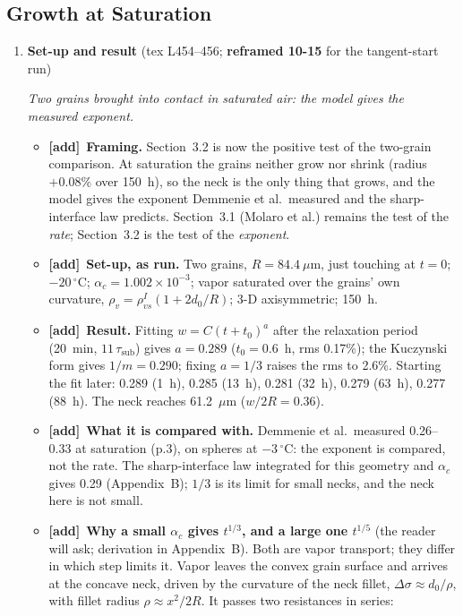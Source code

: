 \documentclass[11pt]{article}
\newcommand{\Pg}[3]{\item \textbf{#1} {\small(#2)}\par\textit{#3}}
\newcommand{\tA}{\textcolor{have}{\textbf{[add]}}\ }
\begin{document}
\subsection{Growth at Saturation}
\begin{enumerate}
\Pg{Set-up and result}{tex L454--456; \textbf{reframed 10-15} for the tangent-start run}{Two grains brought into contact in saturated air: the model gives the measured exponent.}
  \begin{itemize}
  \item \tA \textbf{Framing.} Section~3.2 is now the positive test of the
    two-grain comparison. At saturation the grains neither grow nor shrink
    (radius $+0.08\%$ over 150~h), so the neck is the only thing that grows,
    and the model gives the exponent Demmenie et al.\ measured and the
    sharp-interface law predicts. Section~3.1 (Molaro et al.) remains the
    test of the \emph{rate}; Section~3.2 is the test of the \emph{exponent}.
  \item \tA \textbf{Set-up, as run.} Two grains, $R = 84.4~\mu$m, just
    touching at $t = 0$; $-20\,^{\circ}$C; $\alpha_c = 1.002\times10^{-3}$;
    vapor saturated over the grains' own curvature, $\rho_v =
    \rho_{vs}^{I}(1 + 2d_0/R)$; 3-D axisymmetric; 150~h.
  \item \tA \textbf{Result.} Fitting $w = C(t+t_0)^{a}$ after the relaxation
    period (20~min, $11\,\tau_{\mathrm{sub}}$) gives $a = 0.289$ ($t_0 =
    0.6$~h, rms 0.17\%); the Kuczynski form gives $1/m = 0.290$; fixing
    $a = 1/3$ raises the rms to 2.6\%. Starting the fit later: 0.289 (1~h),
    0.285 (13~h), 0.281 (32~h), 0.279 (63~h), 0.277 (88~h). The neck reaches
    61.2~$\mu$m ($w/2R = 0.36$).
  \item \tA \textbf{What it is compared with.} Demmenie et al.\ measured
    0.26--0.33 at saturation (p.3), on spheres at $-3\,^{\circ}$C: the
    exponent is compared, not the rate. The sharp-interface law integrated
    for this geometry and $\alpha_c$ gives 0.29 (Appendix~B); $1/3$ is its
    limit for small necks, and the neck here is not small.
  \item \tA \textbf{Why a small $\alpha_c$ gives $t^{1/3}$, and a large one
    $t^{1/5}$} (the reader will ask; derivation in Appendix~B). Both are
    vapor transport; they differ in which step limits it. Vapor leaves the
    convex grain surface and arrives at the concave neck, driven by the
    curvature of the neck fillet, $\Delta\sigma \approx d_0/\rho$, with fillet
    radius $\rho \approx x^2/2R$. It passes two resistances in series:

\end{itemize}
\end{enumerate}
\end{document}
